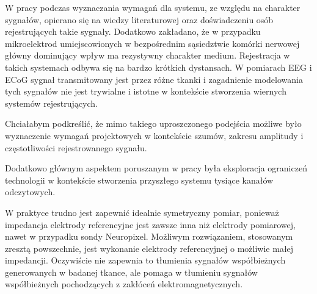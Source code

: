 \begin{frame}[t]
W pracy podczas wyznaczania wymagań dla systemu, ze względu na charakter sygnałów, opierano się na wiedzy literaturowej oraz doświadczeniu osób rejestrujących takie sygnały.
Dodatkowo zakładano, że w przypadku mikroelektrod umiejscowionych w bezpośrednim sąsiedztwie komórki nerwowej główny dominujący wpływ ma rezystywny charakter medium. 
Rejestracja w takich systemach odbywa się na bardzo krótkich dystansach.
W pomiarach EEG i ECoG sygnał transmitowany jest przez różne tkanki i zagadnienie modelowania tych sygnałów nie jest trywialne i istotne w kontekście stworzenia wiernych systemów rejestrujących.

Chciałabym podkreślić, że mimo takiego uproszczonego podejścia możliwe było wyznaczenie wymagań projektowych w kontekście szumów, zakresu amplitudy i częstotliwości rejestrowanego sygnału.

Dodatkowo głównym aspektem poruszanym w pracy była eksploracja ograniczeń technologii w kontekście stworzenia przyszłego systemu tysiące kanałów odczytowych.

\end{frame}
\begin{frame}[t]
    \begin{block}{\tb}
    \end{block}
    W praktyce trudno jest zapewnić idealnie symetryczny pomiar, ponieważ impedancja elektrody referencyjne jest zawsze inna niż elektrody pomiarowej, nawet w przypadku sondy Neuropixel. 
    Możliwym rozwiązaniem, stosowanym zresztą powszechnie, jest wykonanie elektrody referencyjnej o możliwie małej impedancji. 
    Oczywiście nie zapewnia to tłumienia sygnałów współbieżnych generowanych w badanej tkance, ale pomaga w tłumieniu sygnałów współbieżnych pochodzących z zakłóceń elektromagnetycznych. 
\end{frame}

